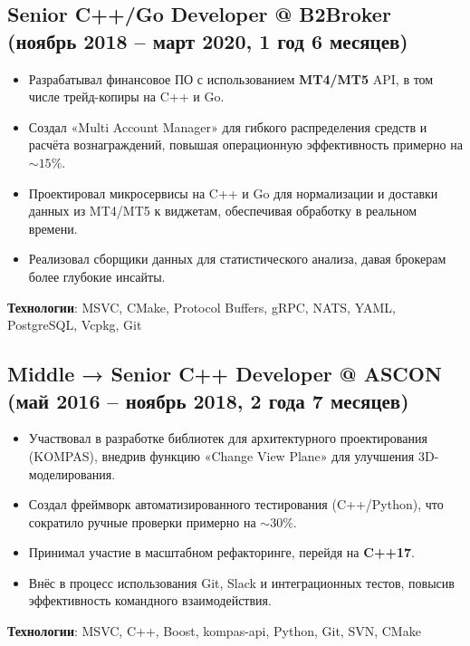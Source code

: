 \documentclass[a4paper,12pt]{article}
\begin{document}
\subsection*{Senior C++/Go Developer @ B2Broker \quad (ноябрь 2018 – март 2020, 1 год 6 месяцев)}
\begin{itemize}[leftmargin=15pt]
    \item Разрабатывал финансовое ПО с использованием \textbf{MT4/MT5} API, в том числе трейд-копиры на C++ и Go.
    \item Создал «Multi Account Manager» для гибкого распределения средств и расчёта вознаграждений, повышая операционную эффективность примерно на \(\sim 15\%\).
    \item Проектировал микросервисы на C++ и Go для нормализации и доставки данных из MT4/MT5 к виджетам, обеспечивая обработку в реальном времени.
    \item Реализовал сборщики данных для статистического анализа, давая брокерам более глубокие инсайты.
\end{itemize}

\textbf{Технологии}: MSVC, CMake, Protocol Buffers, gRPC, NATS, YAML, PostgreSQL, Vcpkg, Git

\vspace{3mm}

\subsection*{Middle → Senior C++ Developer @ ASCON \quad (май 2016 – ноябрь 2018, 2 года 7 месяцев)}
\begin{itemize}[leftmargin=15pt]
    \item Участвовал в разработке библиотек для архитектурного проектирования (KOMPAS), внедрив функцию «Change View Plane» для улучшения 3D-моделирования.
    \item Создал фреймворк автоматизированного тестирования (C++/Python), что сократило ручные проверки примерно на \(\sim 30\%\).
    \item Принимал участие в масштабном рефакторинге, перейдя на \textbf{C++17}.
    \item Внёс в процесс использования Git, Slack и интеграционных тестов, повысив эффективность командного взаимодействия.
\end{itemize}

\textbf{Технологии}: MSVC, C++, Boost, kompas-api, Python, Git, SVN, CMake

\vspace{3mm}
\end{document}
